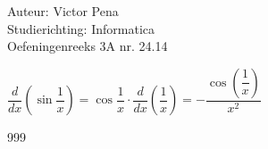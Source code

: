 \documentclass[a4paper]{article}
\begin{document}
	
	\noindent \large Auteur: Victor Pena \\
	\noindent \large Studierichting: Informatica\\
	\noindent \large Oefeningenreeks 3A nr. 24.14\\
	
	\medskip
	
	$\dfrac{d}{dx}\left(\sin\dfrac{1}{x}\right)= \cos\dfrac{1}{x}\cdot\dfrac{d}{dx} \left(\dfrac{1}{x}\right)= -\dfrac{\cos\left(\dfrac{1}{x}\right)}{x^2} $ 
	
	\normalsize 
	
	
	\begin{thebibliography}{999}
	\end{thebibliography}
\end{document}
